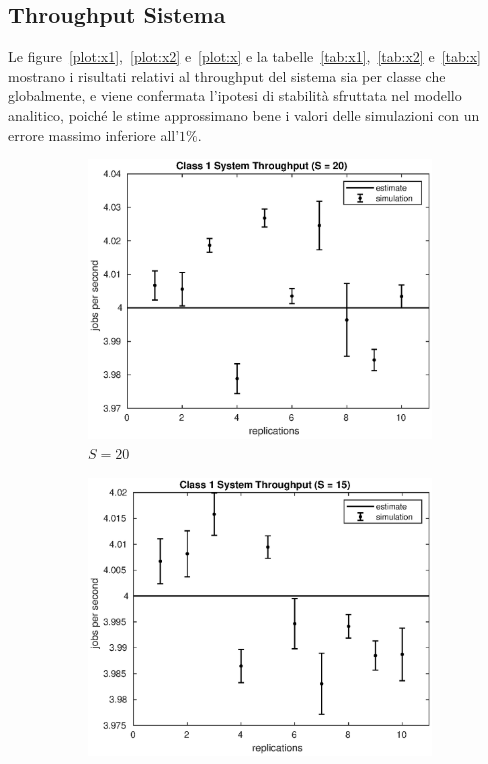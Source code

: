 \subsection{Throughput Sistema}
Le figure~\ref{plot:x1},~\ref{plot:x2} e~\ref{plot:x} e la
tabelle~\ref{tab:x1},~\ref{tab:x2} e~\ref{tab:x} mostrano i risultati relativi
al throughput del sistema sia per classe che globalmente, e viene confermata
l'ipotesi di stabilità sfruttata nel modello analitico, poiché le stime
approssimano bene i valori delle simulazioni con un errore massimo inferiore
all'$1\%$.
\begin{figure}[!h]
\centering
%
\begin{subfigure}[t]{0.49\textwidth}
\includegraphics[width=\textwidth]{figures/simul/20_500K_x1}
\caption{$S = 20$}
\label{20_x1}
\end{subfigure}
%
\begin{subfigure}[t]{0.49\textwidth}
\includegraphics[width=\textwidth]{figures/simul/15_500K_x1}

\end{subfigure}
\end{figure}
